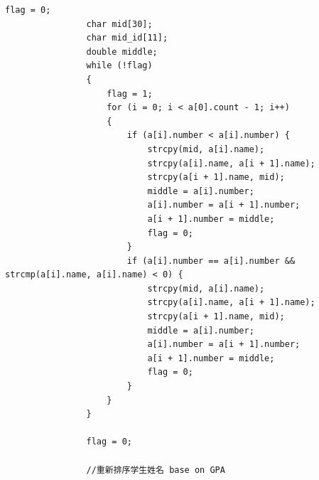 \documentclass[fontset=windows]{article}
\begin{document}
\begin{lstlisting}[style = {cppstyle}]
				flag = 0;
				char mid[30];
				char mid_id[11];
				double middle;
				while (!flag)
				{
					flag = 1;
					for (i = 0; i < a[0].count - 1; i++)
					{
						if (a[i].number < a[i].number) {
							strcpy(mid, a[i].name);
							strcpy(a[i].name, a[i + 1].name);
							strcpy(a[i + 1].name, mid);
							middle = a[i].number;
							a[i].number = a[i + 1].number;
							a[i + 1].number = middle;
							flag = 0;
						}
						if (a[i].number == a[i].number && strcmp(a[i].name, a[i].name) < 0) {
							strcpy(mid, a[i].name);
							strcpy(a[i].name, a[i + 1].name);
							strcpy(a[i + 1].name, mid);
							middle = a[i].number;
							a[i].number = a[i + 1].number;
							a[i + 1].number = middle;
							flag = 0;
						}
					}
				}
	
				flag = 0;
	
				//重新排序学生姓名 base on GPA
	

\end{lstlisting}
\end{document}
